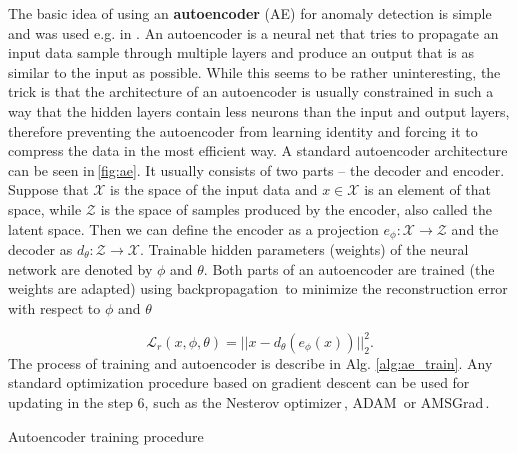 The basic idea of using an \textbf{autoencoder} (AE) for anomaly detection
is simple and was used e.g. in \cite{sakurada2014anomaly,thompson2002implicit}.
An autoencoder is a neural net that tries to propagate an input data
sample through multiple layers and produce an output that is as similar
to the input as possible. While this seems to be rather uninteresting,
the trick is that the architecture of an autoencoder is usually constrained
in such a way that the hidden layers contain less neurons than the
input and output layers, therefore preventing the autoencoder from
learning identity and forcing it to compress the data in the most
efficient way. A standard autoencoder architecture can be seen in\,\ref{fig:ae}.
It usually consists of two parts -- the decoder and encoder. Suppose
that $\mathcal{X}$ is the space of the input data and $x\in\mathcal{X}$
is an element of that space, while $\mathcal{Z}$ is the space of
samples produced by the encoder, also called the latent space. Then
we can define the encoder as a projection $e_{\phi}:\mathcal{X}\rightarrow\mathcal{Z}$
and the decoder as $d_{\theta}:\mathcal{Z}\rightarrow\mathcal{X}$.
Trainable hidden parameters (weights) of the neural network are denoted
by $\phi$ and $\theta$. Both parts of an autoencoder are trained
(the weights are adapted) using backpropagation\,\cite{werbos1982applications}
to minimize the reconstruction error with respect to $\phi$ and $\theta$

\begin{equation}
\mathcal{L}_{r}(x,\phi,\theta)=||x-d_{\theta}(e_{\phi}(x))||_{2}^{2}.\label{eq:ae_loss}
\end{equation}
The process of training and autoencoder is describe in Alg. \ref{alg:ae_train}.
Any standard optimization procedure based on gradient descent can
be used for updating in the step 6, such as the Nesterov optimizer\,\cite{nesterov1983method},
ADAM\,\cite{kingma2014adam} or AMSGrad\,\cite{reddi2019convergence}.
\begin{algorithm}

\caption{Autoencoder training procedure}
\label{alg:ae_train}

\end{algorithm}

